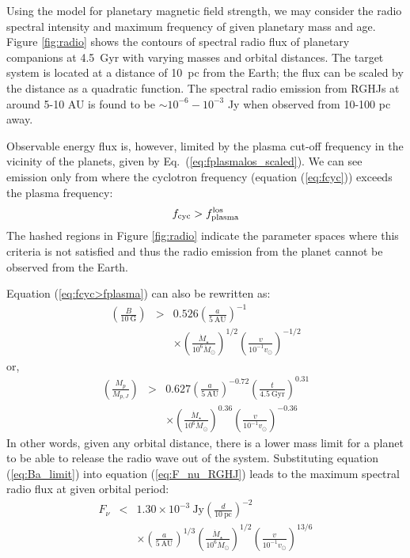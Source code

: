 \documentclass{emulateapj}
\begin{document}
Using the model for planetary magnetic field strength, we may consider the  radio spectral intensity and maximum frequency of given planetary mass and age. 
Figure \ref{fig:radio} shows the contours of spectral radio flux of planetary companions at 4.5~Gyr with varying masses and orbital distances. 
The target system is located at a distance of 10~pc from the Earth; the flux can be scaled by the distance as a quadratic function. 
The spectral radio emission from RGHJs at around 5-10 AU is found to be $\sim 10^{-6}-10^{-3}$ Jy when observed from 10-100 pc away. 

Observable energy flux is, however, limited by the plasma cut-off frequency in the vicinity of the planets, given by Eq.~(\ref{eq:fplasmalos_scaled}).
We can see emission only from where the cyclotron frequency (equation (\ref{eq:fcyc})) exceeds the plasma frequency:
\begin{equation}
\label{eq:fcyc>fplasma} f_{\rm cyc} > f_{\rm plasma}^{\rm los}
\end{equation} 
The hashed regions in Figure \ref{fig:radio} indicate the parameter spaces where this criteria is not satisfied and thus the radio emission from the planet cannot be observed from the Earth. 

Equation (\ref{eq:fcyc>fplasma}) can also be rewritten as: 
\begin{eqnarray}
 \left( \frac{B}{10~\mbox{G}} \right) &>& 0.526 \left( \frac{a}{5~\mbox{AU}} \right)^{-1} \\
 && \times \left( \frac{\dot M_\star}{10^6 \dot M_{\odot}} \right)^{1/2}  \left( \frac{v}{10^{-1}v_{\odot}} \right)^{-1/2} \label{eq:Ba_limit}
\end{eqnarray}
or, 
\begin{eqnarray}
 \left( \frac{M_p}{M_{p,J}} \right) &> & 0.627 \left( \frac{a}{5~\mbox{AU}} \right)^{-0.72} \left( \frac{t}{4.5~\mbox{Gyr}} \right)^{0.31} \\
 && \times \left( \frac{\dot M_\star}{10^6 \dot M_{\odot}} \right)^{0.36}  \left( \frac{v}{10^{-1}v_{\odot}} \right)^{-0.36} \label{eq:Ma_limit}
\end{eqnarray}
In other words, given any orbital distance, there is a lower mass limit for a planet to be able to release the  radio wave out of the system. 
Substituting equation (\ref{eq:Ba_limit}) into equation (\ref{eq:F_nu_RGHJ}) leads to the maximum spectral radio flux at given orbital period:
\begin{eqnarray}
F_{\nu} &<& 1.30 \times 10^{-3}~\mbox{Jy} \left( \frac{d}{10~\mbox{pc}} \right)^{-2} \\
&& \times \left( \frac{a}{5~\mbox{AU}} \right)^{1/3}  \left( \frac{\dot M_\star}{10^6 \dot M_{\odot}} \right)^{1/2} \left( \frac{v}{10^{-1} v_{\odot}} \right)^{13/6}
\end{eqnarray}
\end{document}
